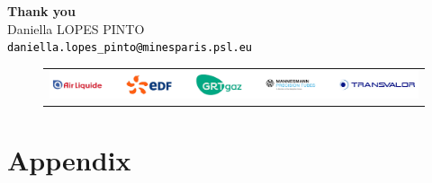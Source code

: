 \documentclass[9pt]{beamer}
\begin{document}
\begin{frame}{}
    \noindent\makebox[\linewidth]{\rule{1.0\textwidth}{0.4pt}}

    \vspace{0.3cm}

    \begin{center}
        \Huge{\textcolor{MINESBlue}{\textbf{Thank you}}} \\
        \vspace{1.0cm}
        \normalsize Daniella LOPES PINTO \\
        \vspace{0.1cm}
        \small \texttt{\textcolor{black}{daniella.lopes\_pinto@minesparis.psl.eu}}
    \end{center}

    \vspace{0.3cm}

    \noindent\makebox[\linewidth]{\rule{1.0\textwidth}{0.4pt}}

    \begin{figure}
        \begin{tabular}{c}
            \includegraphics[width=1.0\textwidth]{TEMPLATE_IMAGES/logos_MESSIAH.pdf} \\
        \end{tabular}
    \end{figure}

\end{frame}


\section*{Appendix}

\end{document}
